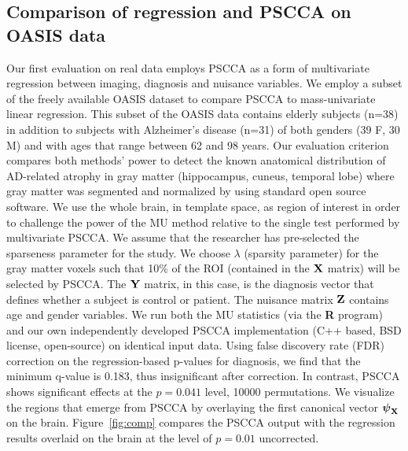 \documentclass{llncs}
\newcommand{\X}{{\bf X}}
\newcommand{\Y}{{\bf Y}}
\newcommand{\Z}{{\bf Z}}
\newcommand{\bs}{\boldsymbol}
\begin{document}
\subsection{Comparison of regression and PSCCA on OASIS data}
Our first evaluation on real data employs PSCCA as a form of
multivariate regression between imaging, diagnosis and nuisance variables.  
We employ a subset of the freely available OASIS dataset to compare
PSCCA to mass-univariate linear regression.  This subset of the OASIS
data contains elderly subjects (n=38) in addition to subjects with
Alzheimer's disease (n=31) of both genders (39 F, 30 M) and with ages
that range between 62 and 98 years.  Our evaluation criterion compares
both methods' power to detect the known anatomical distribution of
AD-related atrophy in gray matter (hippocampus, cuneus, temporal lobe)
\cite{Avants2010b} where gray matter was segmented and normalized by using standard
open source software.  We use the whole brain, in template space, as region of interest in order to
challenge the power of the MU method relative to the
single test performed by multivariate PSCCA.  We assume that the
researcher has pre-selected the sparseness parameter for the study.
We choose $\lambda$ (sparsity parameter) for the gray matter voxels such that 10\% of the
ROI (contained in the $\X$ matrix) will be selected by PSCCA.  The
$\Y$ matrix, in this case, is the diagnosis vector that defines
whether a subject is control or patient.  The nuisance matrix $\Z$
contains age and gender variables.  We run both the MU
statistics (via the {\bf R} program) and our own independently
developed PSCCA implementation (C++ based, BSD license, open-source)
on identical input data.  Using false discovery rate (FDR) correction
on the regression-based p-values for diagnosis, we find that the
minimum q-value is 0.183, thus insignificant after correction.  In
contrast, PSCCA shows significant effects at the $p=0.041$ level,
10000 permutations.  We visualize the regions that emerge from PSCCA
by overlaying the first canonical vector $\bs \psi_{\X}$ on the brain.
Figure~\ref{fig:comp} compares the PSCCA output with the regression
results overlaid on the brain at the level of $p=0.01$ uncorrected.
\end{document}
